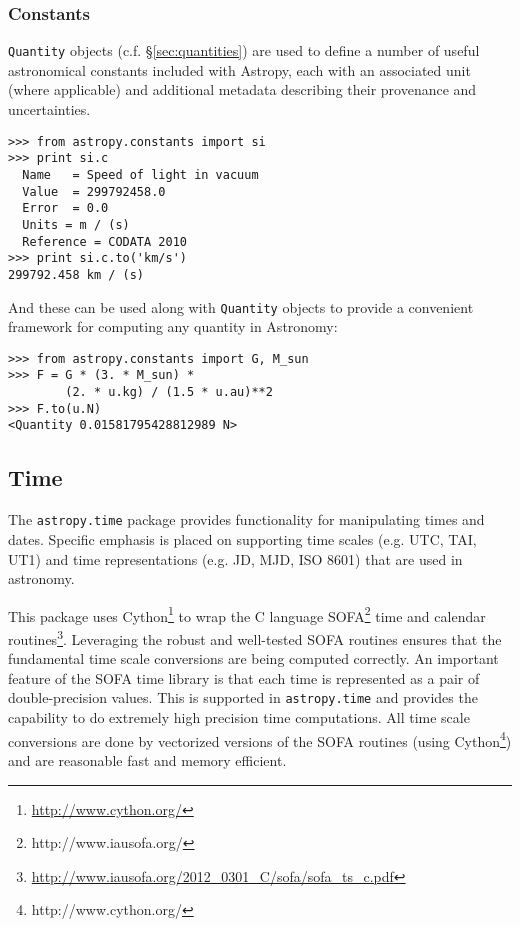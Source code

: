 \documentclass[traditabstract]{aa}
\begin{document}
\subsubsection{Constants}

\texttt{Quantity} objects (c.f. \S\ref{sec:quantities}) are used to define a
number of useful astronomical constants included with Astropy, each with an
associated unit (where applicable) and additional metadata describing their
provenance and uncertainties.
\begin{verbatim}
>>> from astropy.constants import si
>>> print si.c
  Name   = Speed of light in vacuum
  Value  = 299792458.0
  Error  = 0.0
  Units = m / (s)
  Reference = CODATA 2010
>>> print si.c.to('km/s')
299792.458 km / (s)
\end{verbatim}
And these can be used along with \texttt{Quantity} objects to provide a
convenient framework for computing any quantity in Astronomy:
\begin{verbatim}
>>> from astropy.constants import G, M_sun
>>> F = G * (3. * M_sun) *
        (2. * u.kg) / (1.5 * u.au)**2
>>> F.to(u.N)
<Quantity 0.01581795428812989 N>
\end{verbatim}

\subsection{Time}


The \texttt{astropy.time} package provides functionality for manipulating
times and dates.  Specific emphasis is placed on supporting time scales
(e.g. UTC, TAI, UT1) and time representations (e.g. JD, MJD, ISO 8601) that
are used in astronomy.

This package uses Cython\footnote{\url{http://www.cython.org/}} to wrap the C
language SOFA\footnote{http://www.iausofa.org/} time and calendar
routines\footnote{\url{http://www.iausofa.org/2012_0301_C/sofa/sofa_ts_c.pdf}}.
Leveraging the robust and well-tested
SOFA routines ensures that the
fundamental time scale conversions are being computed correctly.  An important
feature of the SOFA time library is that each time is represented as a pair of
double-precision values.  This is supported in \texttt{astropy.time} and
provides the capability to do extremely high precision time computations.  All
time scale conversions are done by vectorized versions of the SOFA
routines (using Cython\footnote{http://www.cython.org/}) and are reasonable
fast and memory efficient.
\end{document}
